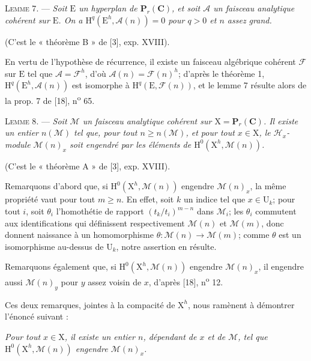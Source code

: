 \textsc{Lemme 7}. --- \textit{Soit $\mathrm{E}$ un hyperplan de $\mathbf{P}_r(\mathbf{C})$, et soit $\mathcal{A}$ un faisceau analytique cohérent sur $\mathrm{E}$. On a $\mathrm{H}^q(\mathrm{E}^h, \mathcal{A}(n)) = 0$ pour $q > 0$ et $n$ assez grand.}

(C'est le « théorème B » de [3], exp. XVIII).

En vertu de l'hypothèse de récurrence, il existe un faisceau algébrique cohérent $\mathcal{F}$ sur $\mathrm{E}$ tel que $\mathcal{A} = \mathcal{F}^h$, d'où $\mathcal{A}(n) = \mathcal{F}(n)^h$; d'après le théorème 1, $\mathrm{H}^q(\mathrm{E}^h, \mathcal{A}(n))$ est isomorphe à $\mathrm{H}^q(\mathrm{E}, \mathcal{F}(n))$, et le lemme 7 résulte alors de la prop. 7 de [18], n\textsuperscript{o} 65.

\textsc{Lemme 8}. --- \textit{Soit $\mathcal{M}$ un faisceau analytique cohérent sur $\mathrm{X} = \mathbf{P}_r(\mathbf{C})$. Il existe un entier $n(\mathcal{M})$ tel que, pour tout $n \geqslant n(\mathcal{M})$, et pour tout $x \in \mathrm{X}$, le $\mathcal{H}_x$-module $\mathcal{M}(n)_x$ soit engendré par les éléments de $\mathrm{H}^0(\mathrm{X}^h, \mathcal{M}(n))$.}

(C'est le « théorème A » de [3], exp. XVIII).



Remarquons d'abord que, si $\mathrm{H}^0(\mathrm{X}^h, \mathcal{M}(n))$ engendre $\mathcal{M}(n)_x$, la même propriété vaut pour tout $m \geqslant n$. En effet, soit $k$ un indice tel que $x \in \mathrm{U}_k$; pour tout $i$, soit $\theta_i$ l'homothétie de rapport $(t_k/t_i)^{m-n}$ dans $\mathcal{M}_i$; les $\theta_i$ commutent aux identifications qui définissent respectivement $\mathcal{M}(n)$ et $\mathcal{M}(m)$, donc donnent naissance à un homomorphisme $\theta : \mathcal{M}(n) \to \mathcal{M}(m)$; comme $\theta$ est un isomorphisme au-dessus de $\mathrm{U}_k$, notre assertion en résulte.

Remarquons également que, si $\mathrm{H}^0(\mathrm{X}^h, \mathcal{M}(n))$ engendre $\mathcal{M}(n)_x$, il engendre aussi $\mathcal{M}(n)_y$ pour $y$ assez voisin de $x$, d'après [18], n\textsuperscript{o} 12.

Ces deux remarques, jointes à la compacité de $\mathrm{X}^h$, nous ramènent à démontrer l'énoncé suivant :

\textit{Pour tout $x \in \mathrm{X}$, il existe un entier $n$, dépendant de $x$ et de $\mathcal{M}$, tel que $\mathrm{H}^0(\mathrm{X}^h, \mathcal{M}(n))$ engendre $\mathcal{M}(n)_x$.}

